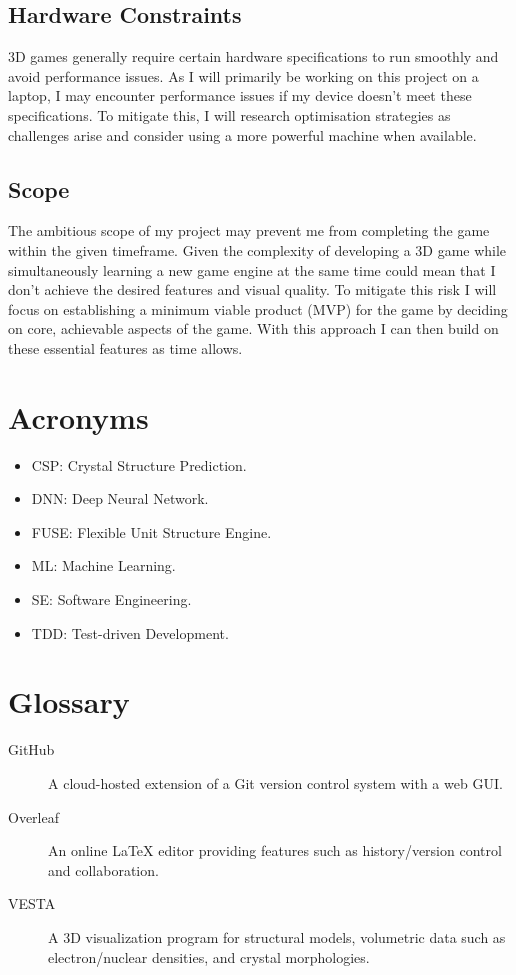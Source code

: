 \documentclass[12pt]{article}
\begin{document}
\subsection{Hardware Constraints}
3D games generally require certain hardware specifications to run smoothly and avoid performance issues. As I will primarily be working on this project on a laptop, I may encounter performance issues if my device doesn't meet these specifications. To mitigate this, I will research optimisation strategies as challenges arise and consider using a more powerful machine when available. 
\subsection{Scope}
The ambitious scope of my project may prevent me from completing the game within the given timeframe. Given the complexity of developing a 3D game while simultaneously learning a new game engine at the same time could mean that I don’t achieve the desired features and visual quality. To mitigate this risk I will focus on establishing a minimum viable product (MVP) for the game by deciding on core, achievable aspects of the game. With this approach I can then build on these essential features as time allows.



\section*{Acronyms}
\begin{itemize}
    \item CSP: Crystal Structure Prediction.
    \item DNN: Deep Neural Network.
    \item FUSE: Flexible Unit Structure Engine.
    \item ML: Machine Learning.
    \item SE: Software Engineering.
    \item TDD: Test-driven Development.
\end{itemize}

\section*{Glossary}
\begin{description}
    \item[GitHub] A cloud-hosted extension of a Git version control system with a web GUI.
    \item[Overleaf] An online LaTeX editor providing features such as history/version control and collaboration.
    \item[VESTA] A 3D visualization program for structural models, volumetric data such as electron/nuclear densities, and crystal morphologies.
\end{description}
\end{document}
